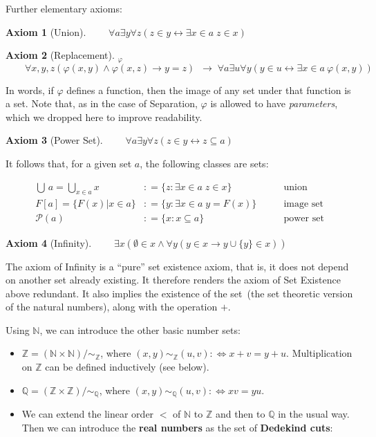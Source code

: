 \documentclass{article}
\newcommand{\Nat}{\mathbb{N}}
\newcommand{\Integer}{\mathbb{Z}}
\newcommand{\Rat}{\mathbb{Q}}
\newtheorem{axiom}{Axiom}[section]
\begin{document}
Further elementary axioms:

\begin{axiom}[Union]$\qquad \forall a \exists y \forall z (z \in y  \leftrightarrow  \exists x \in a \; z \in x)$

\end{axiom}\begin{axiom}[Replacement]\textbf{$_{{}\varphi}$}\\
$\qquad  \forall x,y,z (\varphi(x,y) \wedge \varphi(x,z) \to y=z) \;  \: \rightarrow \; \forall a \exists u \forall y (y \in u \leftrightarrow \exists x \in a \: \varphi(x,y))$

\end{axiom}In words, if ${}\varphi$ defines a function, then the image of any set under that function is a set. Note that, as in the case of Separation, ${}\varphi$ is allowed to have \textit{parameters}, which we dropped here to improve readability.

\begin{axiom}[Power Set]$\qquad \forall a \exists y \forall z (z \in y \leftrightarrow z \subseteq a)$

\end{axiom}It follows that, for a given set $a$, the following classes are sets:

\begin{align*}
\bigcup \, a = \bigcup_{x \in a} x & : = \{z \colon \exists x \in a \; z \in x \}  &  \qquad  \text{union}\\
F[a] = \{F(x)|x \in a\} &: = \{y\colon \exists x \in a \; y = F(x) \}  &  \qquad  \text{image set}\\
\mathcal{P}(a) &: = \{x\colon x \subseteq a\} & \qquad  \text{power set}
\end{align*}

\begin{axiom}[Infinity]$\qquad \exists x ( \emptyset \in x \wedge \forall y ( y \in x \to y \cup \{y\} \in x))$

\end{axiom}The axiom of Infinity is a ``pure'' set existence axiom, that is, it does not depend on another set already existing. It therefore renders the axiom of Set Existence above redundant.
It also implies the existence of the set~{}\omega (the set theoretic version of the natural numbers), along with the operation $+$.

Using $\Nat$, we can introduce the other basic number sets:

\begin{itemize}
\item $\Integer = (\Nat\times\Nat)/ \sim_\Integer$, where $(x,y) \sim_\Integer (u,v) :\Leftrightarrow  x+v = y+u$. Multiplication on $\Integer$ can be defined inductively (see below).
\item $\Rat = (\Integer\times\Integer)/\sim_\Rat$, where $(x,y) \sim_\Rat (u,v) :\Leftrightarrow xv = yu$.
\item We can extend the linear order $<$ of $\Nat$ to $\Integer$ and then to $\Rat$ in the usual way. Then we can introduce the \textbf{real numbers} as the set of \textbf{Dedekind cuts}:
\end{itemize}
\end{document}

